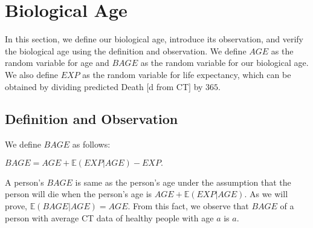 \section{Biological Age}
\label{sec:bio}
In this section, we define our biological age, introduce its observation, and verify the biological age using the definition and observation. We define $AGE$ as the random variable for age and $BAGE$ as the random variable for our biological age. We also define $EXP$ as the random variable for life expectancy, which can be obtained by dividing predicted Death $[$d from CT$]$ by $365$.

\subsection{Definition and Observation}
We define $BAGE$ as follows:
\begin{definition}
$BAGE = AGE + \mathbb{E}\left(EXP | AGE\right) - EXP.$
\end{definition}
A person's $BAGE$ is same as the person's age under the assumption that the person will die when the person's age is $AGE + \mathbb{E}\left(EXP | AGE\right)$. As we will prove, $\mathbb{E}\left(BAGE | AGE\right) = AGE$. From this fact, we observe that $BAGE$ of a person with average CT data of healthy people with age $a$ is $a$.

